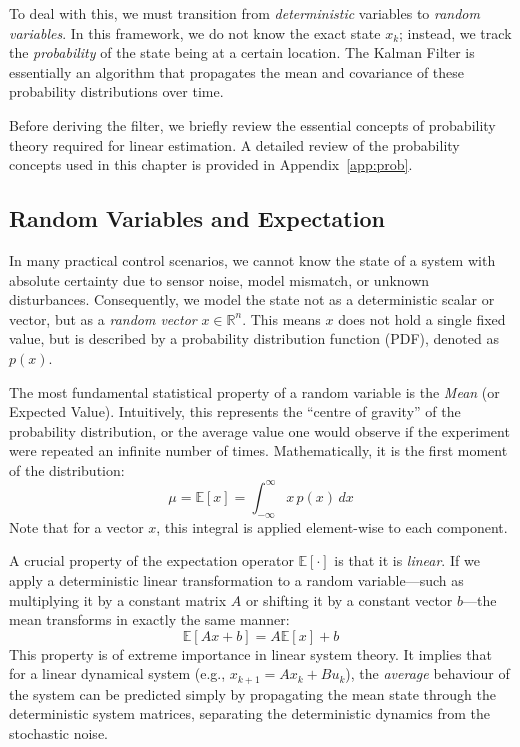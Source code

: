 To deal with this, we must transition from \textit{deterministic} variables to \textit{random variables}. In this framework, we do not know the exact state $x_k$; instead, we track the \textit{probability} of the state being at a certain location. The Kalman Filter is essentially an algorithm that propagates the mean and covariance of these probability distributions over time.

Before deriving the filter, we briefly review the essential concepts of probability theory required for linear estimation. A detailed review of the probability concepts used in this chapter is provided in Appendix~\ref{app:prob}.

\subsection{Random Variables and Expectation}

In many practical control scenarios, we cannot know the state of a system with absolute certainty due to sensor noise, model mismatch, or unknown disturbances. Consequently, we model the state not as a deterministic scalar or vector, but as a \emph{random vector} $x \in \mathbb{R}^n$. This means $x$ does not hold a single fixed value, but is described by a probability distribution function (PDF), denoted as $p(x)$.

The most fundamental statistical property of a random variable is the \emph{Mean} (or Expected Value). Intuitively, this represents the ``centre of gravity'' of the probability distribution, or the average value one would observe if the experiment were repeated an infinite number of times. Mathematically, it is the first moment of the distribution:
\begin{equation*}
	\mu = \mathbb{E}[x] = \int_{-\infty}^{\infty} x \, p(x) \, dx
\end{equation*}
Note that for a vector $x$, this integral is applied element-wise to each component.

A crucial property of the expectation operator $\mathbb{E}[\cdot]$ is that it is \emph{linear}. If we apply a deterministic linear transformation to a random variable—such as multiplying it by a constant matrix $A$ or shifting it by a constant vector $b$—the mean transforms in exactly the same manner:
\begin{equation*}
	\mathbb{E}[A x + b] = A \mathbb{E}[x] + b
\end{equation*}
This property is of extreme importance in linear system theory. It implies that for a linear dynamical system (e.g., $x_{k+1} = A x_k + B u_k$), the \emph{average} behaviour of the system can be predicted simply by propagating the mean state through the deterministic system matrices, separating the deterministic dynamics from the stochastic noise.
